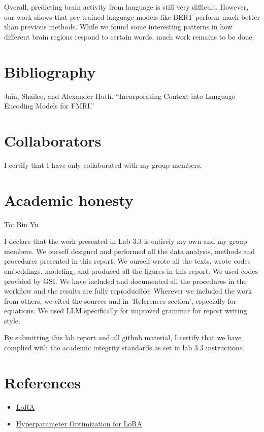\documentclass[12pt,letterpaper]{article}
\begin{document}
Overall, predicting brain activity from language is still very difficult. However, our work shows that pre-trained language models like BERT perform much better than previous methods. While we found some interesting patterns in how different brain regions respond to certain words, much work remains to be done.

\section{Bibliography}

Jain, Shailee, and Alexander Huth. “Incorporating Context into Language Encoding Models for FMRI.” 

\section{Collaborators} 

I certify that I have only collaborated with my group members. 


\section{Academic honesty}
To: Bin Yu 

I declare that the work presented in Lab 3.3 is entirely my own and my group members. We ourself designed and performed all the data analysis, methods and procedures presented in this report. We ourself wrote all the texts, wrote codes embeddings, modeling, and produced all the figures in this report. We used codes provided by GSI. We have included and documented all the procedures in the workflow and the results are fully reproducible. Wherever we included the work from others, we cited the sources and in 'References section', especially for equations. We used LLM specifically for improved grammar for report writing style.

By submitting this lab report and all github material, I certify that we have complied with the academic integrity standards as set in lab 3.3 instructions. 

\section{References}

\begin{itemize}

    \item \href{https://arxiv.org/abs/2106.09685}{LoRA}
    \item \href{https://docs.unsloth.ai/get-started/fine-tuning-guide/lora-hyperparameters-guide}{Hyperparameter Optimization for LoRA}

    
    
\end{itemize}
\end{document}

